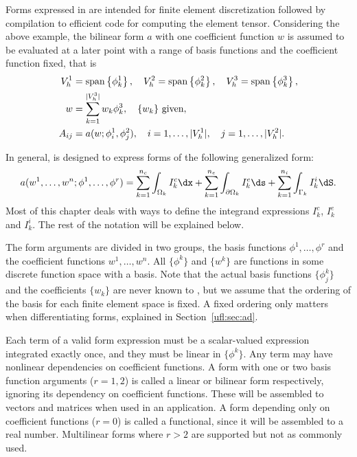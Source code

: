 Forms expressed in \ufl{} are intended for finite element
discretization followed by compilation to efficient code for computing
the element tensor.  Considering the above example, the bilinear form
$a$ with one coefficient function $w$ is assumed to be evaluated at a
later point with a range of basis functions and the coefficient
function fixed, that is
\begin{align}
V_h^1 &= \operatorname{span}\left\{ \phi_k^1 \right\}, \quad V_h^2 = \operatorname{span}\left\{ \phi_k^2 \right\}, \quad V_h^3 = \operatorname{span}\left\{ \phi_k^3 \right\}, \\
w &= \sum_{k=1}^{|V^3_h|} w_k \phi_k^3, \quad \{ w_k \} \mbox{ given}, \\
A_{ij} &= a(w; \phi_i^1, \phi_j^2),
    \quad i = 1,\ldots,|V^1_h|, \quad j = 1,\ldots,|V^2_h| . \label{ufl:eq:Aij}
\end{align}

In general, \ufl{} is designed to express forms of the following generalized form:
\begin{align} \label{ufl:eq:form_integrals}
    a(w^1, \ldots, w^n; \phi^1, \ldots, \phi^r) =
           \sum_{k=1}^{n_c} \int_{\Omega_k}          I^c_k \dx
         + \sum_{k=1}^{n_e} \int_{\partial\Omega_k}  I^e_k \ds
         + \sum_{k=1}^{n_i} \int_{\Gamma_k}          I^i_k \dS.
\end{align}
Most of this chapter deals with ways to define the integrand
expressions $I^c_k$, $I^e_k$ and $I^i_k$.  The rest of the notation
will be explained below.

The form arguments are divided in two groups, the basis functions
$\phi^1,\ldots,\phi^r$ and the coefficient functions $w^1,\ldots,w^n$.
All $\{ \phi^k \}$ and $\{ w^k \}$ are functions in some discrete
function space with a basis.  Note that the actual basis functions $\{
\phi_j^k \}$ and the coefficients $\{ w_k \}$ are never known to
\ufl{}, but we assume that the ordering of the basis for each finite
element space is fixed. A fixed ordering only matters when
differentiating forms, explained in Section~\ref{ufl:sec:ad}.

Each term of a valid form expression must be a scalar-valued
expression integrated exactly once, and they must be linear in $\{
\phi^k \}$.  Any term may have nonlinear dependencies on coefficient
functions.  A form with one or two basis function arguments ($r=1,2$)
is called a linear or bilinear form respectively, ignoring its
dependency on coefficient functions. These will be assembled to
vectors and matrices when used in an application.  A form depending
only on coefficient functions ($r=0$) is called a functional, since it
will be assembled to a real number. Multilinear forms where $r > 2$
are supported but not as commonly used.

